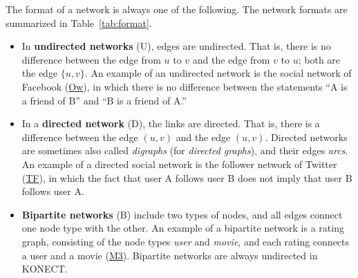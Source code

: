 \documentclass{article}
\begin{document}
The format of a network is always one of the following.  The network
formats are summarized in Table~\ref{tab:format}. 
\begin{itemize}
\item 
  In \textbf{undirected networks} (U), 
  edges are undirected.  That is,
  there is no difference between the edge from $u$ to $v$ and the edge
  from $v$ to $u$; both are the edge $\{u,v\}$. 
  An example of an undirected network is the social network of
  Facebook
  (\href{http://konect.cc/networks/facebook-wosn-wall/}{\textsf{Ow}}),
  in which there is no difference between the statements ``A 
  is a friend of B'' and ``B is a friend of A.''
\item In a \textbf{directed network} (D), 
  the links are directed. That is, there is a
  difference between the edge $(u,v)$ and the edge $(u,v)$. 
  Directed networks are sometimes also called \emph{digraphs} (for \emph{directed
    graphs}), and their edges \emph{arcs}. 
  An example of a directed social network is the follower network of
  Twitter
  (\href{http://konect.cc/networks/twitter_mpi/}{\textsf{TF}}),
  in which the fact that user A follows user B does not imply 
  that user B follows user A. 
\item \textbf{Bipartite networks} (B) 
  include two types of nodes, and all edges
  connect one node type with the other. An example of a bipartite
  network is a rating graph, consisting of the node types \emph{user}
  and \emph{movie}, and each rating connects a user and a movie
  (\href{http://konect.cc/networks/movielens-10m_rating/}{\textsf{M3}}).  
  Bipartite networks are always undirected in KONECT. 
\end{itemize}

\begin{table}
  \caption{
    The network formats allowed in KONECT.
    Each network dataset is exactly of one type.  
    \label{tab:format}
  }
  \centering
{}
\end{table}
\end{document}
